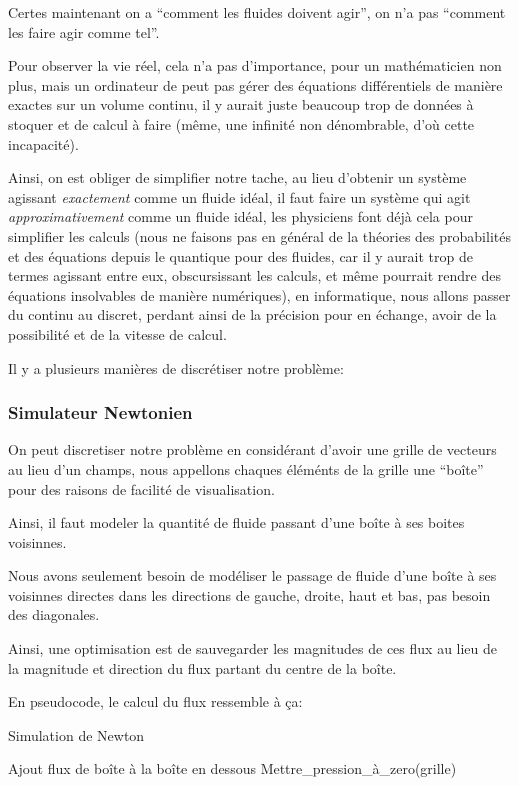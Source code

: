 \documentclass{article}
\begin{document}
Certes maintenant on a ``comment les fluides doivent agir'', on n'a pas ``comment les faire agir comme tel''.

Pour observer la vie réel, cela n'a pas d'importance, pour un mathématicien non plus, mais un ordinateur de peut pas gérer des équations différentiels de manière exactes sur un volume continu, il y aurait juste beaucoup trop de données à stoquer et de calcul à faire (même, une infinité non dénombrable, d'où cette incapacité).

Ainsi, on est obliger de simplifier notre tache, au lieu d'obtenir un système agissant {\emph {exactement}} comme un fluide idéal, il faut faire un système qui agit {\emph {approximativement}} comme un fluide idéal, les physiciens font déjà cela pour simplifier les calculs (nous ne faisons pas en général de la théories des probabilités et des équations depuis le quantique pour des fluides, car il y aurait trop de termes agissant entre eux, obscursissant les calculs, et même pourrait rendre des équations insolvables de manière numériques), en informatique, nous allons passer du continu au discret, perdant ainsi de la précision pour en échange, avoir de la possibilité et de la vitesse de calcul.

Il y a plusieurs manières de discrétiser notre problème:

\subsubsection{Simulateur Newtonien}

On peut discretiser notre problème en considérant d'avoir une grille de vecteurs au lieu d'un champs, nous appellons chaques éléménts de la grille une ``boîte'' pour des raisons de facilité de visualisation.

Ainsi, il faut modeler la quantité de fluide passant d'une boîte à ses boites voisinnes.

Nous avons seulement besoin de modéliser le passage de fluide d'une boîte à ses voisinnes directes dans les directions de gauche, droite, haut et bas, pas besoin des diagonales.

Ainsi, une optimisation est de sauvegarder les magnitudes de ces flux au lieu de la magnitude et direction du flux partant du centre de la boîte.

En pseudocode, le calcul du flux ressemble à ça:

\begin{algorithm}
    \caption{Simulation de Newton}
 {
    Ajout flux de boîte à la boîte en dessous\;
}
Mettre\_pression\_à\_zero(grille)\;
\end{algorithm}
\end{document}
